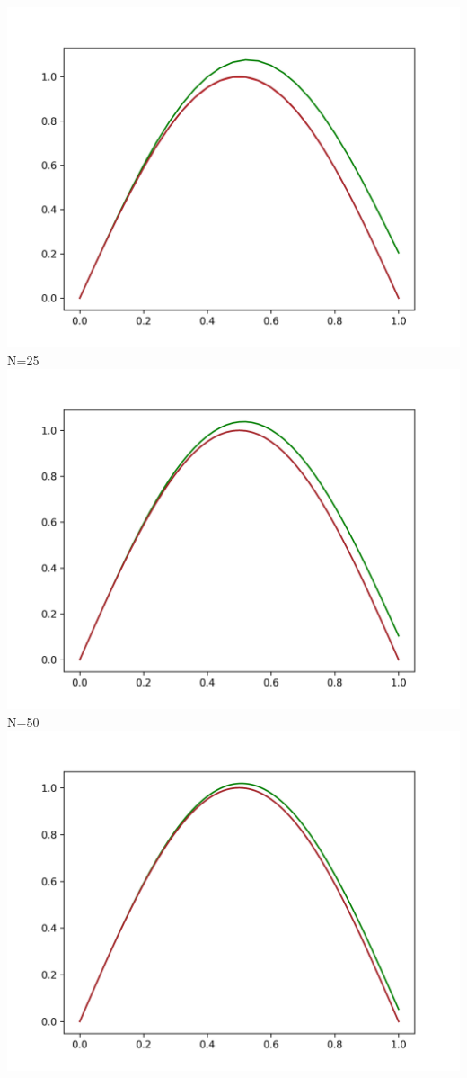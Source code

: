 \documentclass[a4paper,14pt]{article}
\begin{document}
\includegraphics[scale=0.5]{images/graphs/тест_25.png}\newline
N=25\newline
\includegraphics[scale=0.5]{images/graphs/тест_50.png}\newline
N=50\newline
\includegraphics[scale=0.5]{images/graphs/тест_100.png}\newline
\end{document}
